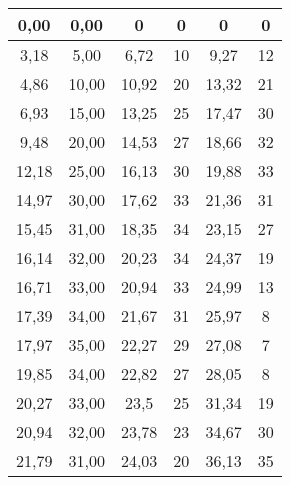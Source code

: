 \documentclass[a4paper, 12pt]{article}
\begin{document}
\begin{longtable}{|c|c|c|c|c|c|}
0,00           & 0,00            & 0                  & 0                  & 0                  & 0                  \\ \hline
3,18           & 5,00            & 6,72               & 10                 & 9,27               & 12                 \\ \hline
4,86           & 10,00           & 10,92              & 20                 & 13,32              & 21                 \\ \hline
6,93           & 15,00           & 13,25              & 25                 & 17,47              & 30                 \\ \hline
9,48           & 20,00           & 14,53              & 27                 & 18,66              & 32                 \\ \hline
12,18          & 25,00           & 16,13              & 30                 & 19,88              & 33                 \\ \hline
14,97          & 30,00           & 17,62              & 33                 & 21,36              & 31                 \\ \hline
15,45          & 31,00           & 18,35              & 34                 & 23,15              & 27                 \\ \hline
16,14          & 32,00           & 20,23              & 34                 & 24,37              & 19                 \\ \hline
16,71          & 33,00           & 20,94              & 33                 & 24,99              & 13                 \\ \hline
17,39          & 34,00           & 21,67              & 31                 & 25,97              & 8                  \\ \hline
17,97          & 35,00           & 22,27              & 29                 & 27,08              & 7                  \\ \hline
19,85          & 34,00           & 22,82              & 27                 & 28,05              & 8                  \\ \hline
20,27          & 33,00           & 23,5               & 25                 & 31,34              & 19                 \\ \hline
20,94          & 32,00           & 23,78              & 23                 & 34,67              & 30                 \\ \hline
21,79          & 31,00           & 24,03              & 20                 & 36,13              & 35                 \\ \hline

\end{longtable}
\end{document}
